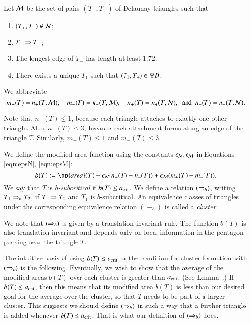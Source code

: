 Let $\mathcal M$ be the set of pairs $(T_+,T_-)$ of Delaunay triangles such that
\begin{enumerate}
\item $(T_+,T_-)\not\in \mathcal N$;
\item $T_+\Rightarrow T_-$;
\item The longest edge of $T_+$ has length  at least $1.72$.
\item There exists a unique $T_1$ such that $(T_1,T_+)\in \Psi D$.
\end{enumerate}

We abbreviate 
\[
m_+(T) = n_+(T,\M), 
\quad m_-(T) = n_-(T,\M), 
\quad n_+(T) =n_+(T,\N), 
\ \text{ and } \ 
n_-(T) = n_-(T,\N).
\]

\begin{remark}
  Note  that $n_+(T)\le 1$, because each triangle attaches to
  exactly one other triangle.  Also, $n_-(T)\le 3$, because each
  attachment forms along an edge of the triangle $T$.  Similarly,
  $m_+(T)\le 1$ and $m_-(T)\le 3$.
\end{remark}


We define the modified area function using the constants $\epsilon_{\mathcal N},\epsilon_{\mathcal M}$
in Equations \eqref{eqn:epsN}, \eqref{eqn:epsM}:
\begin{equation}
b(T) := \op{area}(T) + \epsN (n_+(T) - n_-(T)) + \epsM (m_+(T) - m_-(T)).
\end{equation}
We say that $T$ is {\it $b$-subcritical} if $b(T) \le a_\text{crit}$.  We define
a relation $(\Rightarrow_{b})$, writing
$T_1\Rightarrow_{b} T_2$, if $T_1\Rightarrow T_2$ and $T_1$ is $b$-subcritical.  An
equivalence classes of triangles under the corresponding equivalence
relation $(\equiv_b)$ is called a {\it cluster}.

We note that $(\Rightarrow_{b})$ is given by a translation-invariant rule.  The
function $b(T)$ is also translation invariant and depends only on
local information in the pentagon packing near the triangle $T$.

The intuitive basis of using $b(T)\le a_\text{crit}$ as the condition for
cluster formation with $(\Rightarrow_{b})$ is the following.  Eventually, we wish
to show that the average of the modified areas $b(T)$ over each
cluster is greater than $a_\text{crit}$.  (See Lemma~.)  If
$b(T)\le a_\text{crit}$, then this means that its modified area $b(T)$ is
less than our desired goal for the average over the cluster, so that
$T$ needs to be part of a larger cluster.  This suggests we should
define $(\Rightarrow_{b})$ in such a way that a further triangle is added
whenever $b(T)\le a_\text{crit}$. That is what our definition of $(\Rightarrow_{b})$
does.


